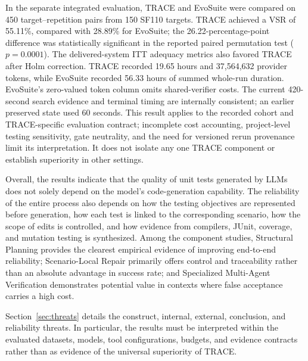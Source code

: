 \documentclass[pdflatex,sn-basic,Numbered,iicol]{sn-jnl}
\begin{document}
In the separate integrated evaluation, TRACE and EvoSuite were compared on 450 target--repetition pairs from 150 SF110 targets. TRACE achieved a VSR of 55.11\%, compared with 28.89\% for EvoSuite; the 26.22-percentage-point difference was statistically significant in the reported paired permutation test ($p=0.0001$). The delivered-system ITT adequacy metrics also favored TRACE after Holm correction. TRACE recorded 19.65 hours and 37,564,632 provider tokens, while EvoSuite recorded 56.33 hours of summed whole-run duration. EvoSuite's zero-valued token column omits shared-verifier costs. The current 420-second search evidence and terminal timing are internally consistent; an earlier preserved state used 60 seconds. This result applies to the recorded cohort and TRACE-specific evaluation contract; incomplete cost accounting, project-level testing sensitivity, gate neutrality, and the need for versioned rerun provenance limit its interpretation. It does not isolate any one TRACE component or establish superiority in other settings.

Overall, the results indicate that the quality of unit tests generated by LLMs does not solely depend on the model's code-generation capability. The reliability of the entire process also depends on how the testing objectives are represented before generation, how each test is linked to the corresponding scenario, how the scope of edits is controlled, and how evidence from compilers, JUnit, coverage, and mutation testing is synthesized. Among the component studies, Structural Planning provides the clearest empirical evidence of improving end-to-end reliability; Scenario-Local Repair primarily offers control and traceability rather than an absolute advantage in success rate; and Specialized Multi-Agent Verification demonstrates potential value in contexts where false acceptance carries a high cost.

Section~\ref{sec:threats} details the construct, internal, external, conclusion, and reliability threats. In particular, the results must be interpreted within the evaluated datasets, models, tool configurations, budgets, and evidence contracts rather than as evidence of the universal superiority of TRACE.
\end{document}
